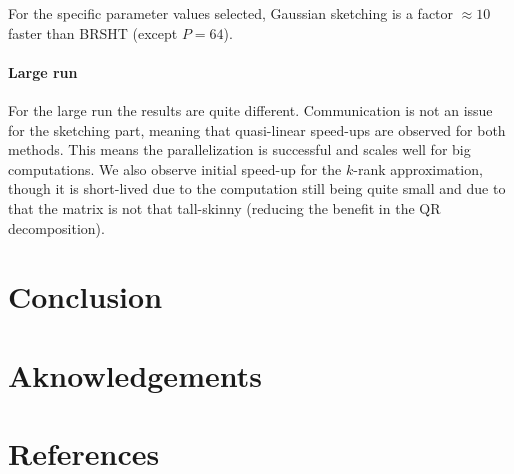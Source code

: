 \documentclass[a4paper, 12pt,oneside]{article}
\begin{document}
			For the specific parameter values selected, Gaussian sketching is a factor $\approx 10$ faster than BRSHT (except $P=64$).
			\paragraph{Large run}
			For the large run the results are quite different. Communication is not an issue for the sketching part, meaning that quasi-linear speed-ups are observed for both methods. This means the parallelization is successful and scales well for big computations. We also observe initial speed-up for the $k$-rank approximation, though it is short-lived due to the computation still being quite small and due to that the matrix is not that tall-skinny (reducing the benefit in the QR decomposition). 
	\section{Conclusion}
	\section*{Aknowledgements}
	\section*{References}
\end{document}
